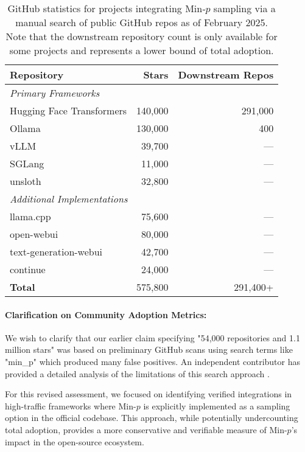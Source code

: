 \documentclass{article}
\begin{document}
\begin{table}[ht]
\centering
\begin{tabular}{lrr}
\toprule
\textbf{Repository} & \textbf{Stars} & \textbf{Downstream Repos} \\
\midrule
\multicolumn{3}{l}{\textit{Primary Frameworks}} \\
\midrule
Hugging Face Transformers & 140,000 & 291,000 \\
Ollama                   & 130,000 & 400 \\
vLLM                     & 39,700  & --- \\
SGLang                   & 11,000  & --- \\
unsloth                  & 32,800  & --- \\
\midrule
\multicolumn{3}{l}{\textit{Additional Implementations}} \\
\midrule
llama.cpp                & 75,600  & --- \\
open-webui               & 80,000  & --- \\
text-generation-webui    & 42,700  & --- \\
continue                 & 24,000  & --- \\
\midrule
\textbf{Total}           & 575,800 & 291,400+ \\
\bottomrule
\end{tabular}
\caption{GitHub statistics for projects integrating Min‑\( p \) sampling via a manual search of public GitHub repos as of February 2025. Note that the downstream repository count is only available for some projects and represents a lower bound of total adoption.}
\label{tab:github_stats}
\end{table}

\paragraph{Clarification on Community Adoption Metrics:}
We wish to clarify that our earlier claim specifying "54,000 repositories and 1.1 million stars" was based on preliminary GitHub scans using search terms like "min\_p" which produced many false positives. An independent contributor has provided a detailed analysis of the limitations of this search approach \cite{menhguin2025minpissue6}.

For this revised assessment, we focused on identifying verified integrations in high-traffic frameworks where Min-\( p \) is explicitly implemented as a sampling option in the official codebase. This approach, while potentially undercounting total adoption, provides a more conservative and verifiable measure of Min-\( p \)'s impact in the open-source ecosystem.
\end{document}
